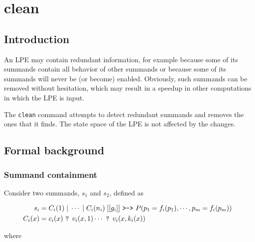 \chapter{clean}

\section{Introduction}

An LPE may contain redundant information, for example because some of its summands contain all behavior of other summands or because some of its summands will never be (or become) enabled.
Obviously, such summands can be removed without hesitation, which may result in a speedup in other computations in which the LPE is input.

The \texttt{clean} command attempts to detect redundant summands and removes the ones that it finds.
The state space of the LPE is not affected by the changes.

\section{Formal background}

\subsection{Summand containment}

Consider two summands, $s_1$ and $s_2$, defined as

\begin{align*}
s_i &= C_i(1) \;|\; \cdots{} \;|\; C_i(n_i) \; [[g_i]] \text{ \texttt{>->} } P(p_1 = f_i(p_1), \cdots{}, p_m = f_i(p_m)) \\
C_i(x) &= c_i(x) \text{ \texttt{?} } v_i(x,1) \cdots{} \text{ \texttt{?} } v_i(x,k_i(x))
\end{align*}

where

